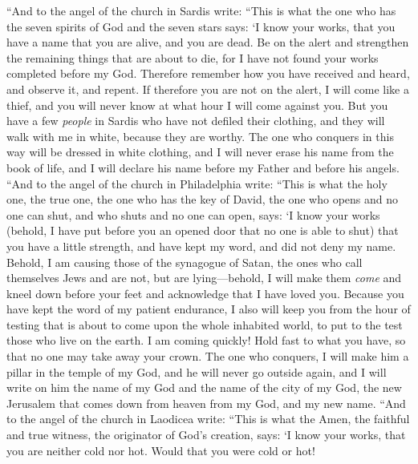 \begin{biblechapter} %
 “And to the angel of the church in Sardis write:
\verse “This is what the one who has the seven spirits of God and the seven stars says: ‘I know your works, that you have a name that you are alive, and you are dead.
\verse Be on the alert and strengthen the remaining things that are about to die, for I have not found your works completed before my God.
\verse Therefore remember how you have received and heard, and observe it, and repent. If therefore you are not on the alert, I will come like a thief, and you will never know at what hour I will come against you.
\verse But you have a few \textit{people} in Sardis who have not defiled their clothing, and they will walk with me in white, because they are worthy.
\verse The one who conquers in this way will be dressed in white clothing, and I will never erase his name from the book of life, and I will declare his name before my Father and before his angels.
 “And to the angel of the church in Philadelphia write:
\verse “This is what the holy one, the true one, the one who has the key of David, the one who opens and no one can shut, and who shuts and no one can open, says:
\verse ‘I know your works (behold, I have put before you an opened door that no one is able to shut) that you have a little strength, and have kept my word, and did not deny my name.
\verse Behold, I am causing those of the synagogue of Satan, the ones who call themselves Jews and are not, but are lying—behold, I will make them \textit{come} and kneel down before your feet and acknowledge that I have loved you.
\verse Because you have kept the word of my patient endurance, I also will keep you from the hour of testing that is about to come upon the whole inhabited world, to put to the test those who live on the earth.
\verse I am coming quickly! Hold fast to what you have, so that no one may take away your crown.
\verse The one who conquers, I will make him a pillar in the temple of my God, and he will never go outside again, and I will write on him the name of my God and the name of the city of my God, the new Jerusalem that comes down from heaven from my God, and my new name.
 “And to the angel of the church in Laodicea write:
\verse “This is what the Amen, the faithful and true witness, the originator of God’s creation, says:
\verse ‘I know your works, that you are neither cold nor hot. Would that you were cold or hot!

\end{biblechapter}
